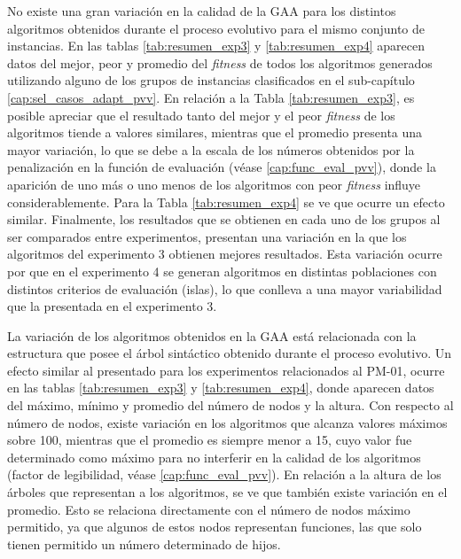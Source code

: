 No existe una gran variación en la calidad de la GAA para los distintos algoritmos obtenidos durante el proceso evolutivo para el mismo conjunto de instancias. En las tablas \ref{tab:resumen_exp3} y \ref{tab:resumen_exp4} aparecen datos del mejor, peor y promedio del \textit{fitness} de todos los algoritmos generados utilizando alguno de los grupos de instancias clasificados en el sub-capítulo \ref{cap:sel_casos_adapt_pvv}. En relación a la Tabla \ref{tab:resumen_exp3}, es posible apreciar que el resultado tanto del mejor y el peor \textit{fitness} de los algoritmos tiende a valores similares, mientras que el promedio presenta una mayor variación, lo que se debe a la escala de los números obtenidos por la penalización en la función de evaluación (véase \ref{cap:func_eval_pvv}), donde la aparición de uno más o uno menos de los algoritmos con peor \textit{fitness} influye considerablemente. Para la Tabla \ref{tab:resumen_exp4} se ve que ocurre un efecto similar. Finalmente, los resultados que se obtienen en cada uno de los grupos al ser comparados entre experimentos, presentan una variación en la que los algoritmos del experimento 3 obtienen mejores resultados. Esta variación ocurre por que en el experimento 4 se generan algoritmos en distintas poblaciones con distintos criterios de evaluación (islas), lo que conlleva a una mayor variabilidad que la presentada en el experimento 3.

La variación de los algoritmos obtenidos en la GAA está relacionada con la estructura  que posee el árbol sintáctico obtenido durante el proceso evolutivo. Un efecto similar al presentado para los experimentos relacionados al PM-01, ocurre en las tablas \ref{tab:resumen_exp3} y \ref{tab:resumen_exp4}, donde aparecen datos del máximo, mínimo y promedio del número de nodos y la altura. Con respecto al número de nodos, existe variación en los algoritmos que alcanza valores máximos sobre 100, mientras que el promedio es siempre menor a 15, cuyo valor fue determinado como máximo para no interferir en la calidad de los algoritmos (factor de legibilidad, véase \ref{cap:func_eval_pvv}). En relación a la altura de los árboles que representan a los algoritmos, se ve que también existe variación en el promedio. Esto se relaciona directamente con el número de nodos máximo permitido, ya que algunos de estos nodos representan funciones, las que solo tienen permitido un número determinado de hijos.

